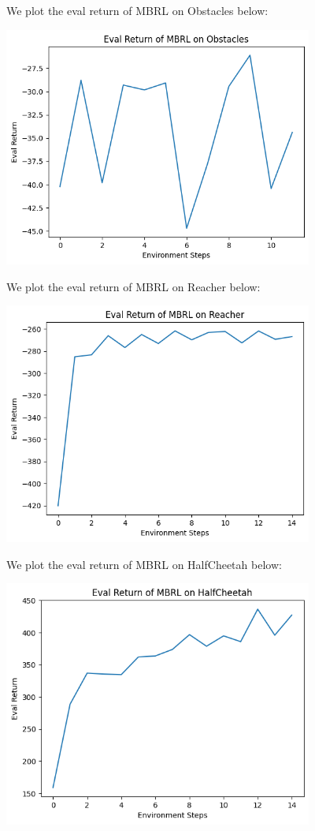 \documentclass{article} %
\begin{document}
\begin{sol}
  We plot the eval return of MBRL on Obstacles below:
  \begin{center}
    \includegraphics[width=4in]{images/q3/obstacles.png}
  \end{center}
  We plot the eval return of MBRL on Reacher below:
  \begin{center}
    \includegraphics[width=4in]{images/q3/reacher.png}
  \end{center}
  We plot the eval return of MBRL on HalfCheetah below:
  \begin{center}
    \includegraphics[width=4in]{images/q3/cheetah.png}
  \end{center}
\end{sol}
\end{document}

